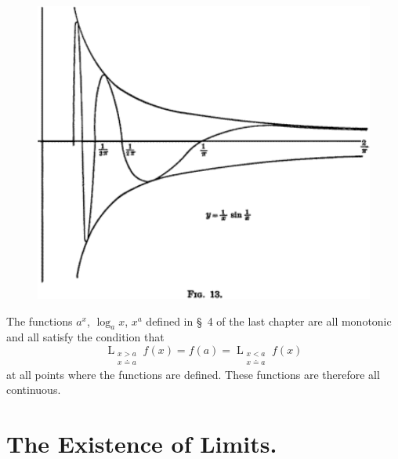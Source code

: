 \documentclass[a4paper,12pt]{book}[2004/02/16]
\providecommand{\hyperlink}[2]{#2}
\providecommand{\hypertarget}[2]{#2}
\theoremstyle{ilemma}
\theoremstyle{itheorem}
\theoremstyle{iother}
\theoremstyle{icorollary}
\theoremstyle{numcorollary}
\theoremstyle{idefinition}
\begin{document}
\begin{figure}[!hbtp]\label{fig13}\hypertarget{fig13}{}
\centering
\includegraphics{images/fig13}
\end{figure}

The functions $a^x$, $\log_a x$\label{logp64}, $x^a$ defined in \hyperlink{chIIIsec4}{\S~4}
of the \hyperlink{chapIII}{last chapter} are all monotonic and all satisfy the condition
that
\[
  \mathop{L}_{\substack{x>a\\x\doteq a}}f(x)
  = f(a) = \mathop{L}_{\substack{x<a\\x\doteq a}}f(x)
\]
at all points where the functions are defined. These functions are
therefore all continuous.


\section{The Existence of Limits.}\hypertarget{chIVsec2}{}%
\end{document}
